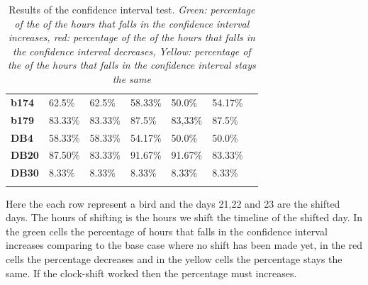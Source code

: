 \documentclass[a4paper]{article}
\begin{document}
\begin{table}[H]
{\begin{tabular}{lllllllllll}
\multicolumn{1}{|l|}{\textbf{b174}} & \multicolumn{1}{l|}{\cellcolor[HTML]{BBDAFF}62.5\%} & \multicolumn{1}{l|}{\cellcolor[HTML]{EA6D67}62.5\%} & \multicolumn{1}{l|}{\cellcolor[HTML]{EA6D67}58.33\%} & \multicolumn{1}{l|}{\cellcolor[HTML]{EA6D67}50.0\%} & \multicolumn{1}{l|}{\cellcolor[HTML]{EA6D67}54.17\%} & \multicolumn{5}{l}{\cellcolor[HTML]{FFFFFF}} \\ \cline{1-6}
\multicolumn{1}{|l|}{\textbf{b179}} & \multicolumn{1}{l|}{\cellcolor[HTML]{BBDAFF}83.33\%} & \multicolumn{1}{l|}{\cellcolor[HTML]{FFFE65}83.33\%} & \multicolumn{1}{l|}{\cellcolor[HTML]{4ECF94}87.5\%} & \multicolumn{1}{l|}{\cellcolor[HTML]{FFFE65}83,33\%} & \multicolumn{1}{l|}{\cellcolor[HTML]{4ECF94}87.5\%} & \multicolumn{5}{l}{\cellcolor[HTML]{FFFFFF}} \\ \cline{1-6}
\multicolumn{1}{|l|}{\textbf{DB4}} & \multicolumn{1}{l|}{\cellcolor[HTML]{BBDAFF}58.33\%} & \multicolumn{1}{l|}{\cellcolor[HTML]{FFFE65}58.33\%} & \multicolumn{1}{l|}{\cellcolor[HTML]{EA6D67}54.17\%} & \multicolumn{1}{l|}{\cellcolor[HTML]{EA6D67}50.0\%} & \multicolumn{1}{l|}{\cellcolor[HTML]{EA6D67}50.0\%} & \multicolumn{5}{l}{\cellcolor[HTML]{FFFFFF}} \\ \cline{1-6}
\multicolumn{1}{|l|}{\textbf{DB20}} & \multicolumn{1}{l|}{\cellcolor[HTML]{BBDAFF}87.50\%} & \multicolumn{1}{l|}{\cellcolor[HTML]{EA6D67}83.33\%} & \multicolumn{1}{l|}{\cellcolor[HTML]{4ECF94}91.67\%} & \multicolumn{1}{l|}{\cellcolor[HTML]{4ECF94}91.67\%} & \multicolumn{1}{l|}{\cellcolor[HTML]{EA6D67}83.33\%} & \multicolumn{5}{l}{\cellcolor[HTML]{FFFFFF}} \\ \cline{1-6}
\multicolumn{1}{|l|}{\textbf{DB30}} & \multicolumn{1}{l|}{\cellcolor[HTML]{BBDAFF}8.33\%} & \multicolumn{1}{l|}{\cellcolor[HTML]{FFFE65}8.33\%} & \multicolumn{1}{l|}{\cellcolor[HTML]{FFFE65}8.33\%} & \multicolumn{1}{l|}{\cellcolor[HTML]{FFFE65}8.33\%} & \multicolumn{1}{l|}{\cellcolor[HTML]{FFFE65}8.33\%} & \multicolumn{5}{l}{\multirow{-8}{*}{\cellcolor[HTML]{FFFFFF}}} \\ \cline{1-6}
\multicolumn{11}{l}{}
\end{tabular}
}
\caption{Results of the confidence interval test. \small{\emph{Green: percentage of the of the hours that falls in the confidence interval increases, 
red: percentage of the of the hours that falls in the confidence interval decreases, Yellow: percentage of the of the hours that falls in the confidence interval stays the same }}}
\label{my-label}
\end{table}
Here the each row represent a bird and the days 21,22 and 23 are the shifted days. The hours of shifting is the hours we shift the timeline of the shifted day. In the green cells the percentage of hours that falls in the confidence interval increases comparing to the base case where no shift has been made yet, in the red cells the percentage decreases and in the yellow cells the percentage stays the same. If the clock-shift worked then the percentage must increases.\\\\
\end{document}
